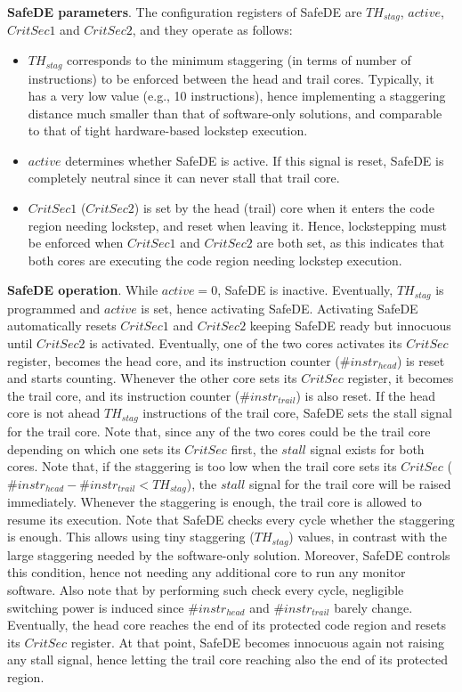 \textbf{SafeDE parameters}. The configuration registers of SafeDE are $TH_{stag}$, $active$, $CritSec1$ and $CritSec2$, and they operate as follows:
\begin{itemize}
\item $TH_{stag}$ corresponds to the minimum staggering (in terms of number of instructions) to be enforced between the head and trail cores. Typically, it has a very low value (e.g., 10 instructions), hence implementing a staggering distance much smaller than that of software-only solutions, and comparable to that of tight hardware-based lockstep execution.
\item $active$ determines whether SafeDE is active. If this signal is reset, SafeDE is completely neutral since it can never stall that trail core.
\item $CritSec1$ ($CritSec2$) is set by the head (trail) core when it enters the code region needing lockstep, and reset when leaving it. Hence, lockstepping must be enforced when $CritSec1$ and $CritSec2$ are both set, as this indicates that both cores are executing the code region needing lockstep execution.
\end{itemize}

\textbf{SafeDE operation}. While $active=0$, SafeDE is inactive. Eventually, $TH_{stag}$ is programmed and $active$ is set, hence activating SafeDE. Activating SafeDE automatically resets $CritSec1$ and $CritSec2$ keeping SafeDE ready but innocuous until $CritSec2$ is activated. Eventually, one of the two cores activates its $CritSec$ register, becomes the head core, and its instruction counter ($\#instr_{head}$) is reset and starts counting. Whenever the other core sets its $CritSec$ register, it becomes the trail core, and its instruction counter ($\#instr_{trail}$) is also reset. If the head core is not ahead $TH_{stag}$ instructions of the trail core, SafeDE sets the stall signal for the trail core. Note that, since any of the two cores could be the trail core depending on which one sets its $CritSec$ first, the $stall$ signal exists for both cores. Note that, if the staggering is too low when the trail core sets its $CritSec$ ($\#instr_{head} - \#instr_{trail} < TH_{stag}$), the $stall$ signal for the trail core will be raised immediately. Whenever the staggering is enough, the trail core is allowed to resume its execution.
Note that SafeDE checks every cycle whether the staggering is enough. This allows using tiny staggering ($TH_{stag}$) values, in contrast with the large staggering needed by the software-only solution. Moreover, SafeDE controls this condition, hence not needing any additional core to run any monitor software.
Also note that by performing such check every cycle, negligible switching power is induced since $\#instr_{head}$ and $\#instr_{trail}$ barely change.
Eventually, the head core reaches the end of its protected code region and resets its $CritSec$ register. At that point, SafeDE becomes innocuous again not raising any stall signal, hence letting the trail core reaching also the end of its protected region.

